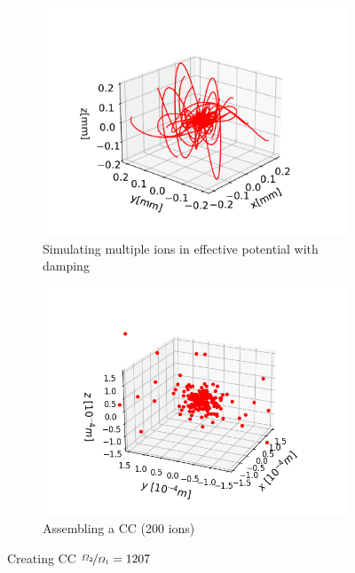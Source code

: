 \begin{figure}[H]
\begin{subfigure}{.5\textwidth}
  \centering
  \includegraphics[width=\linewidth]{img/CC_10.pdf}
  \caption{Simulating multiple ions in effective potential with damping}
\end{subfigure}%
\begin{subfigure}{.5\textwidth}
  \centering
  \includegraphics[width=\linewidth]{img/CC_200.png}  
  \caption{Assembling a CC (200 ions)}
\end{subfigure}
\caption{Creating CC $\nicefrac{\Omega_2}{\Omega_1} = 1207$}
\label{fig:CC-eta=1207}
\end{figure}


